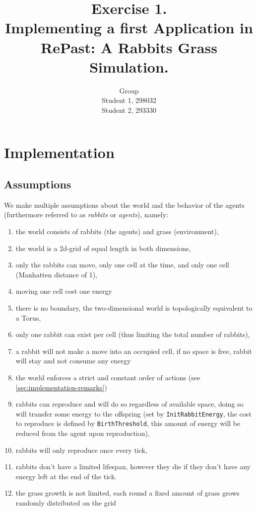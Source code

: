 \documentclass[11pt]{article}
\title{\bf Exercise 1.\\ Implementing a first Application in RePast: A Rabbits Grass Simulation.}
\author{Group \textnumero 29 \\ Student 1, 298032 \\ Student 2, 293330}
\newenvironment{mEnumerate}
{ \begin{enumerate}
    \setlength{\itemsep}{0pt}
    \setlength{\parskip}{0pt}
    \setlength{\parsep}{0pt}     }
{ \end{enumerate}                  }
\begin{document}
\maketitle

\section{Implementation}

\subsection{Assumptions}

We make multiple assumptions about the world and the behavior of the agents (furthermore referred to as \textit{rabbits} or \textit{agents}), namely:

\begin{mEnumerate}
    \item the world consists of rabbits (the agents) and grass (environment),
    \item the world is a 2d-grid of equal length in both dimensions,
    \item only the rabbits can move, only one cell at the time, and only one cell (Manhatten distance of 1),
    \item moving one cell cost one energy
    \item there is no boundary, the two-dimensional world is topologically equivalent to a Torus,
    \item only one rabbit can exist per cell (thus limiting the total number of rabbits),
    \item a rabbit will not make a move into an occupied cell, if no space is free, rabbit will stay and not consume any energy
    \item the world enforces a strict and constant order of actions (see \ref{sec:implementation-remarks})
    \item rabbits can reproduce and will do so regardless of available space, doing so will transfer some energy to the offspring (set by \texttt{InitRabbitEnergy}, the cost to reproduce is defined by \texttt{BirthThreshold}, this amount of energy will be reduced from the agent upon reproduction),
    \item rabbits will only reproduce once every tick,
    \item rabbits don't have a limited lifespan, however they die if they don't have any energy left at the end of the tick.
    \item the grass growth is not limited, each round a fixed amount of grass grows randomly distributed on the grid
\end{mEnumerate}
\end{document}
